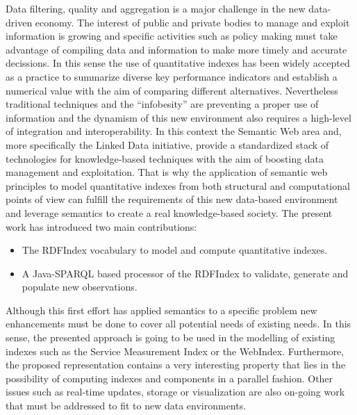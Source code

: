 Data filtering, quality and aggregation is a major challenge in the 
new data-driven economy. The interest of public and private bodies 
to manage and exploit information is growing and specific activities 
such as policy making must take advantage of compiling data and information 
to make more timely and accurate decissions. In this sense the use 
of quantitative indexes has been widely accepted as a practice to 
summarize diverse key performance indicators and establish a numerical 
value with the aim of comparing different alternatives. Nevertheless traditional techniques 
and the ``infobesity'' are preventing a proper use of information and the dynamism 
of this new environment also requires a high-level of integration and interoperability. In this 
context the Semantic Web area and, more specifically the Linked Data initiative, 
provide a standardized stack of technologies for knowledge-based techniques with 
the aim of boosting data management and exploitation. That is why the application 
of semantic web principles to model quantitative indexes from both structural and 
computational points of view can fulfill the requirements of this new data-based 
environment and leverage semantics to create a real knowledge-based society. The 
present work has introduced two main contributions:

\begin{itemize}
 \item The RDFIndex vocabulary to model and compute quantitative indexes.
 \item A Java-SPARQL based processor of the RDFIndex to validate, generate and 
 populate new observations.
\end{itemize}

Although this first effort has applied semantics to a specific problem new enhancements 
must be done to cover all potential needs of existing needs. In this sense, the presented 
approach is going to be used in the modelling of existing indexes such as the Service Measurement Index or 
the WebIndex. Furthermore, the proposed representation contains a very interesting property 
that lies in the possibility of computing indexes and components in a parallel fashion. 
Other issues such as real-time updates, storage or visualization are also on-going work 
that must be addressed to fit to new data environments.





